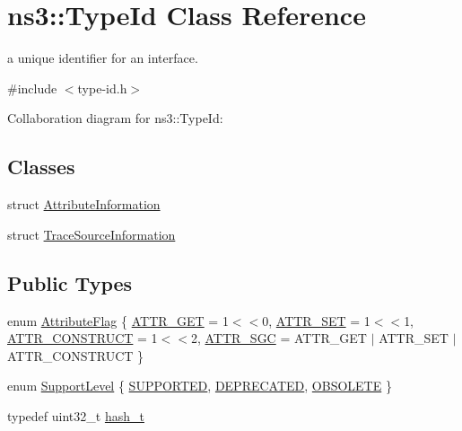 \hypertarget{classns3_1_1TypeId}{}\section{ns3\+:\+:Type\+Id Class Reference}
\label{classns3_1_1TypeId}


a unique identifier for an interface.  




{\ttfamily \#include $<$type-\/id.\+h$>$}



Collaboration diagram for ns3\+:\+:Type\+Id\+:
\subsection*{Classes}
\begin{DoxyCompactItemize}
\item 
struct \hyperlink{structns3_1_1TypeId_1_1AttributeInformation}{Attribute\+Information}
\item 
struct \hyperlink{structns3_1_1TypeId_1_1TraceSourceInformation}{Trace\+Source\+Information}
\end{DoxyCompactItemize}
\subsection*{Public Types}
\begin{DoxyCompactItemize}
\item 
enum \hyperlink{classns3_1_1TypeId_a3ab7b43b95f96391c514d609ca60e542}{Attribute\+Flag} \{ \hyperlink{classns3_1_1TypeId_a3ab7b43b95f96391c514d609ca60e542a3dd4b476c9b257285c177d6c414b5fd0}{A\+T\+T\+R\+\_\+\+G\+ET} = 1$<$$<$0, 
\hyperlink{classns3_1_1TypeId_a3ab7b43b95f96391c514d609ca60e542aa860aabfc04fde3f5fd95529cb706d9e}{A\+T\+T\+R\+\_\+\+S\+ET} = 1$<$$<$1, 
\hyperlink{classns3_1_1TypeId_a3ab7b43b95f96391c514d609ca60e542aa8dc1d5d889cc9489244c94ede243d62}{A\+T\+T\+R\+\_\+\+C\+O\+N\+S\+T\+R\+U\+CT} = 1$<$$<$2, 
\hyperlink{classns3_1_1TypeId_a3ab7b43b95f96391c514d609ca60e542a954bd4fc4ddd08be092b83dbdfd36ed5}{A\+T\+T\+R\+\_\+\+S\+GC} = A\+T\+T\+R\+\_\+\+G\+ET $\vert$ A\+T\+T\+R\+\_\+\+S\+ET $\vert$ A\+T\+T\+R\+\_\+\+C\+O\+N\+S\+T\+R\+U\+CT
 \}
\item 
enum \hyperlink{classns3_1_1TypeId_ad55d31e57490a83a3ededa096a8d2588}{Support\+Level} \{ \hyperlink{classns3_1_1TypeId_ad55d31e57490a83a3ededa096a8d2588a3eb3cddc13c7c70f1ab58e15babdda11}{S\+U\+P\+P\+O\+R\+T\+ED}, 
\hyperlink{classns3_1_1TypeId_ad55d31e57490a83a3ededa096a8d2588aa50cc8669d91c8449f81557ffa5d2024}{D\+E\+P\+R\+E\+C\+A\+T\+ED}, 
\hyperlink{classns3_1_1TypeId_ad55d31e57490a83a3ededa096a8d2588a58ea327927a5feb3b95d6a25bf27f8e1}{O\+B\+S\+O\+L\+E\+TE}
 \}
\item 
typedef uint32\+\_\+t \hyperlink{classns3_1_1TypeId_ab3fc1475c4a0c2cfb35b976dbd609057}{hash\+\_\+t}
\end{DoxyCompactItemize}
